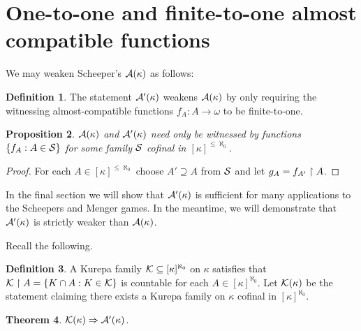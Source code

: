 \documentclass{amsart}
\theoremstyle{plain}
\newtheorem{theorem}{Theorem}
\newtheorem{proposition}[theorem]{Proposition}
\theoremstyle{definition}
\newtheorem{definition}[theorem]{Definition}
\theoremstyle{remark}
\theoremstyle{plain}
\theoremstyle{definition}
\theoremstyle{remark}
\begin{document}
  \section{One-to-one and finite-to-one almost compatible functions}

  We may weaken Scheeper's \(\mathcal{A}(\kappa)\) as follows:

  \begin{definition}
    The statement \(\mathcal{A}'(\kappa)\) weakens \(\mathcal{A}(\kappa)\) by only
    requiring the witnessing almost-compatible functions \(f_A:A\to\omega\)
    to be finite-to-one.
  \end{definition}

  \begin{proposition}
    \(\mathcal{A}(\kappa)\) and \(\mathcal{A}'(\kappa)\) need only be witnessed by
    functions \(\{f_A:A\in\mathcal{S}\}\) for some family \(\mathcal{S}\)
    cofinal in \([\kappa]^{\leq\aleph_0}\).
  \end{proposition}

  \begin{proof}
    For each \(A\in[\kappa]^{\leq\aleph_0}\) choose \(A'\supseteq A\)
    from \(\mathcal{S}\) and let \(g_A=f_{A'}\restriction A\).
  \end{proof}

  In the final section we will show that \(\mathcal{A}'(\kappa)\) is sufficient
  for many applications to the Scheepers and Menger games.
  In the meantime, we will demonstrate that \(\mathcal{A}'(\kappa)\) is strictly
  weaker than \(\mathcal{A}(\kappa)\).

  Recall the following.

  \begin{definition}
    A Kurepa family \(\mathcal{K}\subseteq[\kappa]^{\aleph_0}\) on \(\kappa\)
    satisfies that
    \(\mathcal{K}\restriction A=\{K\cap A:K\in\mathcal{K}\}\) is countable
    for each \(A\in[\kappa]^{\aleph_0}\).
    Let \(\mathcal{K}(\kappa)\) be the statement claiming there exists
    a Kurepa family on \(\kappa\)
    cofinal in \([\kappa]^{\aleph_0}\).
  \end{definition}

  \begin{theorem}
    \(\mathcal{K}(\kappa) \Rightarrow \mathcal{A}'(\kappa)\).
  \end{theorem}
\end{document}
